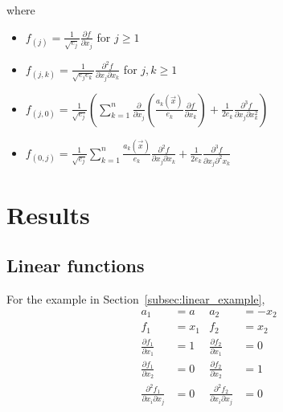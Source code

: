 \documentclass[12pt]{article}
\begin{document}
%
where
\begin{itemize}
\item $f_{(j)} = \frac{1}{\sqrt{e_j}} \frac{\partial f}{\partial x_j}$ for $j \ge 1$
\item $f_{(j, k)} = \frac{1}{\sqrt{e_j e_k}} \frac{\partial^2 f}{\partial x_j \partial x_k}$ for $j,k \ge 1$
\item $f_{(j,0)} = \frac{1}{\sqrt{e_j}} \left( \sum_{k=1}^n \frac{\partial}{\partial x_j} \left( \frac{a_k(\vec{x})}{e_k} \frac{\partial f}{\partial x_k} \right) + \frac{1}{2 e_k} \frac{\partial^3 f}{\partial x_j \partial x_k^2} \right)$
\item $f_{(0, j)} = \frac{1}{\sqrt{e_j}} \sum_{k=1}^n \frac{a_k(\vec{x})}{e_k} \frac{\partial^2 f}{\partial x_j \partial x_k} +\frac{1}{2 e_k}  \frac{\partial^3 f}{\partial x_j \partial^2 x_k}$
\end{itemize}

\section{Results}

\subsection{Linear functions}

For the example in Section~\ref{subsec:linear_example}, 
\begin{equation}
\begin{aligned}
a_1 &= a 
&
a_2 &= -x_2
\\
f_1 &= x_1 
&
f_2 &= x_2 
\\
\frac{\partial f_1}{\partial x_1} &= 1
&
\frac{\partial f_2}{\partial x_1} &= 0 
\\
\frac{\partial f_1}{\partial x_2} &= 0
&
\frac{\partial f_2}{\partial x_2} &= 1 
\\
\frac{\partial^2 f_1}{\partial x_i \partial x_j} &= 0
&
\frac{\partial^2 f_2}{\partial x_i \partial x_j} &= 0
\end{aligned}
\end{equation}
\end{document}
